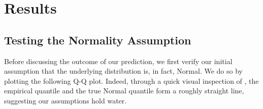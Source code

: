 \documentclass[11pt]{article}
\begin{document}

\section{Results}
\label{sec:results}
\subsection{Testing the Normality Assumption}
Before discussing the outcome of our prediction, we first verify our initial assumption that the underlying distribution is, in fact, Normal. We do so by plotting the following Q-Q plot. Indeed, through a quick visual inspection of , the empirical quantile and the true Normal quantile form a roughly straight line, suggesting our assumptions hold water.
\end{document}
